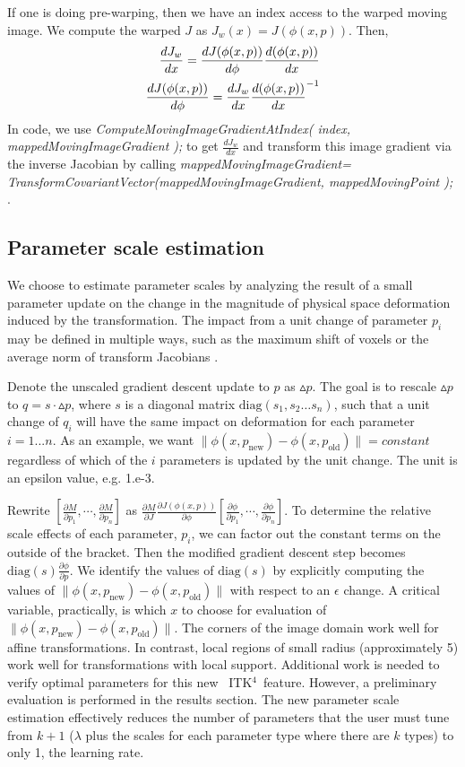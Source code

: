 \documentclass{frontiersSCNS}
\newcommand{\tk}{~ITK$^{\text{4}}$~}
\begin{document}
 If one is doing pre-warping, then we have an index access to the
 warped moving image.  We compute the warped $J$ as
 $J_w(x)=J(\phi(x,p))$.  Then,
\begin{eqnarray}
\frac{dJ_w}{dx}=\frac{dJ(\phi(x,p))}{d\phi}\frac{d(\phi(x,p))}{dx} \\ \notag
\frac{dJ(\phi(x,p))}{d\phi}=\frac{dJ_w}{dx}{\frac{d(\phi(x,p))}{dx}}^{-1} 
\end{eqnarray}
In code, we use {\em ComputeMovingImageGradientAtIndex( index,
mappedMovingImageGradient );} to get $\frac{dJ_w}{dx}$ and transform
this image gradient via the inverse Jacobian by calling 
{\em mappedMovingImageGradient=
TransformCovariantVector(mappedMovingImageGradient, mappedMovingPoint ); }.


\subsection{Parameter scale estimation}
We choose to estimate parameter scales by analyzing the result of a
small parameter update on the change in the magnitude of physical space deformation
induced by the transformation.  The impact from a unit change of
parameter $p_i$ may be defined in multiple ways, such as the maximum shift of
voxels or the average norm of transform Jacobians \cite{Jenkinson2001}.

Denote the unscaled gradient descent update to $p$ as $\vartriangle
p$.  The goal is to rescale $\vartriangle p$ to $q = s \cdot \vartriangle p$, where $s$ is a diagonal
matrix $\text{diag} (s_1, s_2 \ldots s_n)$, such that a unit change of $q_i$ will have
the same impact on deformation for each parameter $i = 1... n$.   
As an example, we want $ \| \phi(x,p_{\text{new}}) -
\phi(x,p_\text{old}) \| = constant $ regardless of which of the
$i$ parameters is updated by the unit change.  The unit is an epsilon
value, e.g. 1.e-3.

Rewrite $[ \frac{\partial
  M}{\partial p_1} , \cdots , \frac{\partial
  M}{\partial p_n} 
 ]$ as $\frac{\partial M}{\partial J}\frac{\partial
  J(\phi(x,p))}{\partial \phi} [ \frac{\partial \phi}{\partial p_1} , \cdots , \frac{\partial \phi}{\partial p_n} ]$.
To determine the relative scale effects of each parameter, $p_i$, we
can factor out the constant terms on the outside of the bracket.  
Then the modified gradient descent step becomes
$\text{diag}(s)\frac{\partial \phi}{\partial p}$.  We identify the values
of $\text{diag}(s)$ by explicitly computing the values of $\| \phi(x,p_{\text{new}}) -
\phi(x,p_\text{old}) \| $ with respect to an $\epsilon$ change.  A critical variable,
practically, is which $x$ to choose for evaluation of $\| \phi(x,p_{\text{new}}) -
\phi(x,p_\text{old}) \| $.  The corners of the image domain work well
for affine transformations.  In contrast, local regions of small radius
(approximately 5) work well for transformations with local support.
Additional work is needed to verify optimal parameters for this new
\tk feature.  However, a preliminary evaluation is performed in the results
section.  The new parameter scale estimation effectively reduces the number of parameters
that the user must tune from $k+1$ ($\lambda$ plus the scales for each
parameter type where there are $k$ types) to only 1, the learning
rate.  
\end{document}
